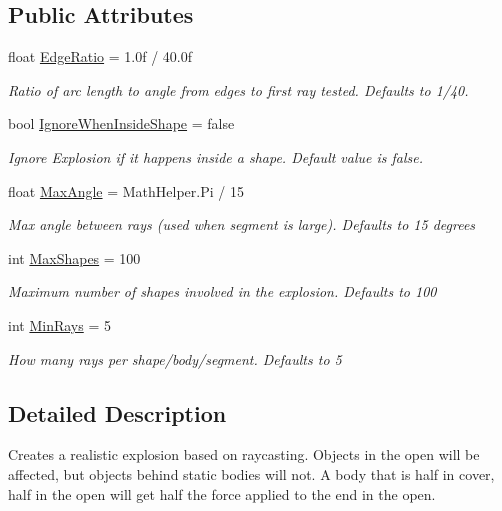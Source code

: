 \subsection*{Public Attributes}
\begin{DoxyCompactItemize}
\item 
float \hyperlink{class_farseer_physics_1_1_common_1_1_physics_logic_1_1_real_explosion_a2db8678751dd2a110631adfba410add4}{Edge\+Ratio} = 1.\+0f / 40.\+0f
\begin{DoxyCompactList}\small\item\em Ratio of arc length to angle from edges to first ray tested. Defaults to 1/40. \end{DoxyCompactList}\item 
bool \hyperlink{class_farseer_physics_1_1_common_1_1_physics_logic_1_1_real_explosion_a17428ac2efbb1b34985a8b2bd8453da8}{Ignore\+When\+Inside\+Shape} = false
\begin{DoxyCompactList}\small\item\em Ignore Explosion if it happens inside a shape. Default value is false. \end{DoxyCompactList}\item 
float \hyperlink{class_farseer_physics_1_1_common_1_1_physics_logic_1_1_real_explosion_a8fa507ae446fa078565c2a2abedd863c}{Max\+Angle} = Math\+Helper.\+Pi / 15
\begin{DoxyCompactList}\small\item\em Max angle between rays (used when segment is large). Defaults to 15 degrees \end{DoxyCompactList}\item 
int \hyperlink{class_farseer_physics_1_1_common_1_1_physics_logic_1_1_real_explosion_ab24c79aade56953ea56d3001750f0d50}{Max\+Shapes} = 100
\begin{DoxyCompactList}\small\item\em Maximum number of shapes involved in the explosion. Defaults to 100 \end{DoxyCompactList}\item 
int \hyperlink{class_farseer_physics_1_1_common_1_1_physics_logic_1_1_real_explosion_a826a15fb3f9d58191a2d5f0b54f3e15c}{Min\+Rays} = 5
\begin{DoxyCompactList}\small\item\em How many rays per shape/body/segment. Defaults to 5 \end{DoxyCompactList}\end{DoxyCompactItemize}


\subsection{Detailed Description}
Creates a realistic explosion based on raycasting. Objects in the open will be affected, but objects behind static bodies will not. A body that is half in cover, half in the open will get half the force applied to the end in the open. 



